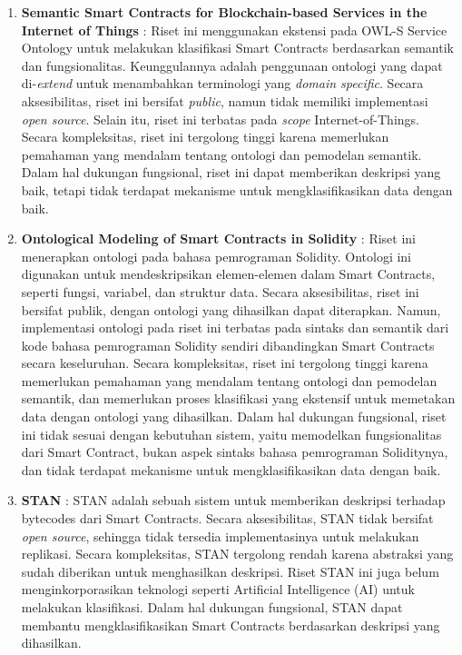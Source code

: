\begin{enumerate}
	\item \textbf{Semantic Smart Contracts for Blockchain-based Services in the Internet of Things} \parencite{baqa2019semantic}: Riset ini menggunakan ekstensi pada OWL-S Service Ontology untuk melakukan klasifikasi Smart Contracts berdasarkan semantik dan fungsionalitas. Keunggulannya adalah penggunaan ontologi yang dapat di-\textit{extend} untuk menambahkan terminologi yang \textit{domain specific}. Secara aksesibilitas, riset ini bersifat \textit{public}, namun tidak memiliki implementasi \textit{open source}. Selain itu, riset ini terbatas pada \textit{scope} Internet-of-Things. Secara kompleksitas, riset ini tergolong tinggi karena memerlukan pemahaman yang mendalam tentang ontologi dan pemodelan semantik. Dalam hal dukungan fungsional, riset ini dapat memberikan deskripsi yang baik, tetapi tidak terdapat mekanisme untuk mengklasifikasikan data dengan baik.

	\item \textbf{Ontological Modeling of Smart Contracts in Solidity} \parencite{cano2021toward}: Riset ini menerapkan ontologi pada bahasa pemrograman Solidity. Ontologi ini digunakan untuk mendeskripsikan elemen-elemen dalam Smart Contracts, seperti fungsi, variabel, dan struktur data. Secara aksesibilitas, riset ini bersifat publik, dengan ontologi yang dihasilkan dapat diterapkan. Namun, implementasi ontologi pada riset ini terbatas pada sintaks dan semantik dari kode bahasa pemrograman Solidity sendiri dibandingkan Smart Contracts secara keseluruhan. Secara kompleksitas, riset ini tergolong tinggi karena memerlukan pemahaman yang mendalam tentang ontologi dan pemodelan semantik, dan memerlukan proses klasifikasi yang ekstensif untuk memetakan data dengan ontologi yang dihasilkan. Dalam hal dukungan fungsional, riset ini tidak sesuai dengan kebutuhan sistem, yaitu memodelkan fungsionalitas dari Smart Contract, bukan aspek sintaks bahasa pemrograman Soliditynya, dan tidak terdapat mekanisme untuk mengklasifikasikan data dengan baik.

	\item \textbf{STAN} \parencite{stan}: STAN adalah sebuah sistem untuk memberikan deskripsi terhadap bytecodes dari Smart Contracts. Secara aksesibilitas, STAN tidak bersifat \textit{open source}, sehingga tidak tersedia implementasinya untuk melakukan replikasi. Secara kompleksitas, STAN tergolong rendah karena abstraksi yang sudah diberikan untuk menghasilkan deskripsi. Riset STAN ini juga belum menginkorporasikan teknologi seperti Artificial Intelligence (AI) untuk melakukan klasifikasi. Dalam hal dukungan fungsional, STAN dapat membantu mengklasifikasikan Smart Contracts berdasarkan deskripsi yang dihasilkan.


\end{enumerate}
